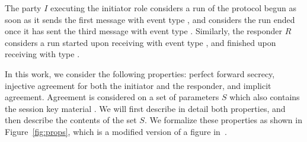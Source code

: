 The party $I$ executing the initiator role considers a run of the protocol
begun as soon as it sends the first message \mMsgone{} with event type
\mIStart, and considers the run ended once it has sent the third message
\mMsgthree{} with event type \mIComplete.
%
Similarly, the responder $R$ considers a run started upon receiving 
\mMsgone{}
with event type \mRStart, and finished upon receiving \mMsgthree{} with 
type
\mRComplete.
%

In this work, we consider the following properties:
perfect forward secrecy, injective agreement for both the initiator and the
responder, and implicit agreement.
%
Agreement is considered on a set of parameters $S$ which also contains the
session key material \mSessKey{}.
%
We will first describe in detail both properties, and then describe the
contents of the set $S$.
%
We formalize these properties as shown in Figure~\ref{fig:props}, which is
a modified version of a figure in~\cite{Norr21}.
